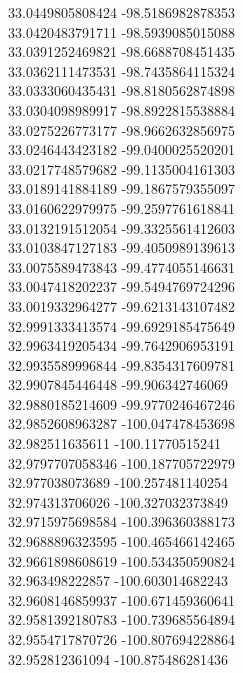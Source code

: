 {33.0449805808424	-98.5186982878353\\
33.0420483791711	-98.5939085015088\\
33.0391252469821	-98.6688708451435\\
33.0362111473531	-98.7435864115324\\
33.0333060435431	-98.8180562874898\\
33.0304098989917	-98.8922815538884\\
33.0275226773177	-98.9662632856975\\
33.0246443423182	-99.0400025520201\\
33.0217748579682	-99.1135004161303\\
33.0189141884189	-99.1867579355097\\
33.0160622979975	-99.2597761618841\\
33.0132191512054	-99.3325561412603\\
33.0103847127183	-99.4050989139613\\
33.0075589473843	-99.4774055146631\\
33.0047418202237	-99.5494769724296\\
33.0019332964277	-99.6213143107482\\
32.9991333413574	-99.6929185475649\\
32.9963419205434	-99.7642906953191\\
32.9935589996844	-99.8354317609781\\
32.9907845446448	-99.906342746069\\
32.9880185214609	-99.9770246467246\\
32.9852608963287	-100.047478453698\\
32.982511635611	-100.11770515241\\
32.9797707058346	-100.187705722979\\
32.977038073689	-100.257481140254\\
32.974313706026	-100.327032373849\\
32.9715975698584	-100.396360388173\\
32.9688896323595	-100.465466142465\\
32.9661898608619	-100.534350590824\\
32.963498222857	-100.603014682243\\
32.9608146859937	-100.671459360641\\
32.9581392180783	-100.739685564894\\
32.9554717870726	-100.807694228864\\
32.952812361094	-100.875486281436\\
}
